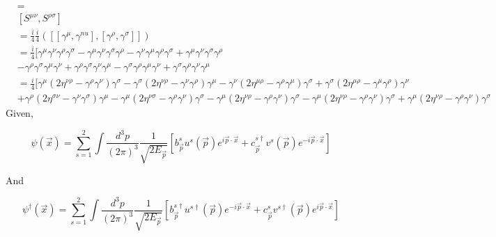 \documentclass[12pt, letterpaper]{article}
\newcommand*{\1}{\hspace{1pt}}
\begin{document}
\begin{align*}
    [M^{\mu \nu}, M^{\rho \sigma}] &= \\ 
    & [S^{\mu \nu}, S^{\rho \sigma}] \\ 
    &= \frac{i}{4}\frac{i}{4}([[\gamma^{\mu}, \gamma^{nu}], [\gamma^{\rho}, \gamma^{\sigma}]]) \\
    &= \frac{i}{4}[\gamma^{\mu}\gamma^{\nu}\gamma^{\rho}\gamma^{\sigma} - \gamma^{\mu}\gamma^{\nu}\gamma^{\sigma}\gamma^{\rho} - \gamma^{\nu}\gamma^{\mu}\gamma^{\rho}\gamma^{\sigma} + \gamma^{\mu}\gamma^{\nu}\gamma^{\sigma}\gamma^{\rho} \\
    &- \gamma^{\rho}\gamma^{\sigma}\gamma^{\mu}\gamma^{\nu} + \gamma^{\rho}\gamma^{\sigma}\gamma^{\nu}\gamma^{\mu} - \gamma^{\sigma}\gamma^{\rho}\gamma^{\mu}\gamma^{\nu} + \gamma^{\sigma}\gamma^{\rho}\gamma^{\nu}\gamma^{\mu} \\
    &= \frac{i}{4}[\gamma^{\mu} (2\eta ^{\nu\rho} - \gamma^{\rho}\gamma^{\nu})\gamma^{\sigma} - \gamma^{\sigma} (2\eta ^{\nu\rho} - \gamma^{\nu}\gamma^{\rho})\gamma^{\mu} -\gamma^{\nu} (2\eta ^{\mu\rho} - \gamma^{\rho}\gamma^{\mu})\gamma^{\sigma} +\gamma^{\sigma} (2\eta ^{\mu\rho} - \gamma^{\mu}\gamma^{\rho})\gamma^{\nu} \\ 
    &+ \gamma^{\rho} (2\eta ^{\sigma\nu} - \gamma^{\nu}\gamma^{\sigma})\gamma^{\mu} - \gamma^{\mu} (2\eta ^{\nu\sigma} - \gamma^{\rho}\gamma^{\nu})\gamma^{\sigma} - \gamma^{\mu} (2\eta ^{\nu\rho} - \gamma^{\rho}\gamma^{\nu})\gamma^{\sigma} - \gamma^{\mu} (2\eta ^{\nu\rho} - \gamma^{\rho}\gamma^{\nu})\gamma^{\sigma} + \gamma^{\mu} (2\eta ^{\nu\rho} - \gamma^{\rho}\gamma^{\nu})\gamma^{\sigma}
\end{align*}
Given,

\begin{equation}
    \psi (\overrightarrow{x} ) = \sum_{s = 1}^{2} \int \frac{d ^{3} p}{(2 \pi) ^{3}} \frac{1}{\sqrt{2 E _{\overrightarrow{p}}}} \left[b^{s} _{\overrightarrow{p}}u^{s}(\overrightarrow{p}) e ^{i \overrightarrow{p} \cdot \overrightarrow{x}} + c^{s \dagger} _{\overrightarrow{p}}v^{s}(\overrightarrow{p}) e ^{ - i \overrightarrow{p} \cdot \overrightarrow{x}}\right]  
\end{equation}

And

\begin{equation}
    \psi ^{\dagger} (\overrightarrow{x} ) = \sum_{s = 1}^{2} \int \frac{d ^{3} p}{(2 \pi) ^{3}} \frac{1}{\sqrt{2 E _{\overrightarrow{p}}}} \left[b^{s \dagger} _{\overrightarrow{p}}u^{s \dagger}(\overrightarrow{p}) e ^{-i \overrightarrow{p} \cdot \overrightarrow{x}} + c^{s} _{\overrightarrow{p}}v^{s \dagger}(\overrightarrow{p}) e ^{i \overrightarrow{p} \cdot \overrightarrow{x}}\right]  
\end{equation}
\end{document}
